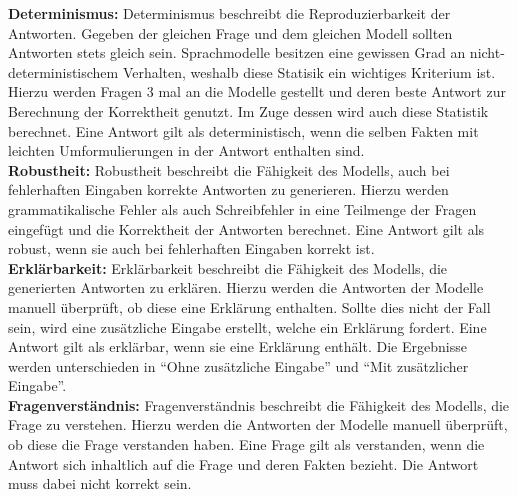 \noindent\textbf{Determinismus:}\newline
Determinismus beschreibt die Reproduzierbarkeit der Antworten.
Gegeben der gleichen Frage und dem gleichen Modell sollten Antworten stets gleich sein.
Sprachmodelle besitzen eine gewissen Grad an nicht-deterministischem Verhalten, weshalb diese Statisik ein wichtiges Kriterium ist.
Hierzu werden Fragen 3 mal an die Modelle gestellt und deren beste Antwort zur Berechnung der Korrektheit genutzt.
Im Zuge dessen wird auch diese Statistik berechnet.
Eine Antwort gilt als deterministisch, wenn die selben Fakten mit leichten Umformulierungen in der Antwort enthalten sind.\\

\noindent\textbf{Robustheit:}\newline
Robustheit beschreibt die Fähigkeit des Modells, auch bei fehlerhaften Eingaben korrekte Antworten zu generieren.
Hierzu werden grammatikalische Fehler als auch Schreibfehler in eine Teilmenge der Fragen eingefügt und die Korrektheit der Antworten berechnet.
Eine Antwort gilt als robust, wenn sie auch bei fehlerhaften Eingaben korrekt ist.\\

\noindent\textbf{Erklärbarkeit:}\newline
Erklärbarkeit beschreibt die Fähigkeit des Modells, die generierten Antworten zu erklären.
Hierzu werden die Antworten der Modelle manuell überprüft, ob diese eine Erklärung enthalten.
Sollte dies nicht der Fall sein, wird eine zusätzliche Eingabe erstellt, welche ein Erklärung fordert.
Eine Antwort gilt als erklärbar, wenn sie eine Erklärung enthält.
Die Ergebnisse werden unterschieden in \enquote{Ohne zusätzliche Eingabe} und \enquote{Mit zusätzlicher Eingabe}.\\

\noindent\textbf{Fragenverständnis:}\newline
Fragenverständnis beschreibt die Fähigkeit des Modells, die Frage zu verstehen.
Hierzu werden die Antworten der Modelle manuell überprüft, ob diese die Frage verstanden haben. Eine Frage gilt als verstanden, wenn die Antwort sich inhaltlich auf die Frage und deren Fakten bezieht. Die Antwort muss dabei nicht korrekt sein.\\
